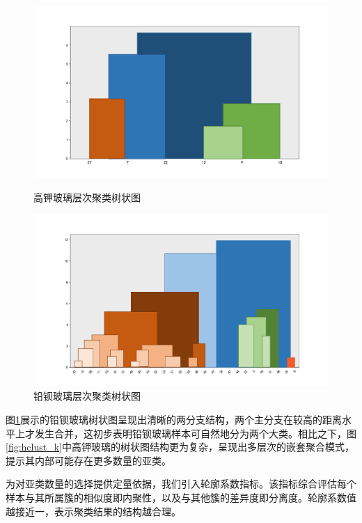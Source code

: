 \begin{figure}[H]
    \centering
    \begin{minipage}{0.48\textwidth}
        \centering
        \includegraphics[width=\linewidth]{figs/4问题二/高钾玻璃_层次聚类树状图.png}
        \caption{高钾玻璃层次聚类树状图}
        \label{fig:hclust_k}
    \end{minipage}\hfill
    \begin{minipage}{0.48\textwidth}
        \centering
        \includegraphics[width=\linewidth]{figs/4问题二/铅钡玻璃_层次聚类树状图.png}
        \caption{铅钡玻璃层次聚类树状图}
        \label{fig:hclust_pb}
    \end{minipage}
\end{figure}

图\ref{fig:hclust_pb}展示的铅钡玻璃树状图呈现出清晰的两分支结构，两个主分支在较高的距离水平上才发生合并，这初步表明铅钡玻璃样本可自然地分为两个大类。相比之下，图\ref{fig:hclust_k}中高钾玻璃的树状图结构更为复杂，呈现出多层次的嵌套聚合模式，提示其内部可能存在更多数量的亚类。

为对亚类数量的选择提供定量依据，我们引入轮廓系数指标。该指标综合评估每个样本与其所属簇的相似度即内聚性，以及与其他簇的差异度即分离度。轮廓系数值越接近一，表示聚类结果的结构越合理。

